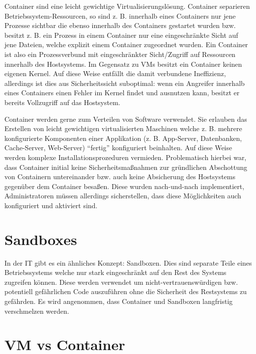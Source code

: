 Container sind eine leicht gewichtige Virtualisierungslösung. Container separieren Betriebssystem-Ressourcen, so sind z. B. innerhalb eines Containers nur jene Prozesse sichtbar die ebenso innerhalb des Containers gestartet wurden bzw. besitzt z. B. ein Prozess in einem Container nur eine eingeschränkte Sicht auf jene Dateien, welche explizit einem Container zugeordnet wurden. Ein Container ist also ein Prozessverbund mit eingeschränkter Sicht/Zugriff auf Ressourcen innerhalb des Hostsystems. Im Gegensatz zu VMs besitzt ein Container keinen eigenen Kernel. Auf diese Weise entfällt die damit verbundene Ineffizienz, allerdings ist dies aus Sicherheitssicht suboptimal: wenn ein Angreifer innerhalb eines Containers einen Fehler im Kernel findet und ausnutzen kann, besitzt er bereits Vollzugriff auf das Hostsystem.

Container werden gerne zum Verteilen von Software verwendet. Sie erlauben das Erstellen von leicht gewichtigen virtualisierten Maschinen welche z. B. mehrere konfigurierte Komponenten einer Applikation (z. B. App-Server, Datenbanken, Cache-Server, Web-Server) ``fertig'' konfiguriert beinhalten. Auf diese Weise werden komplexe Installationsprozeduren vermieden. Problematisch hierbei war, dass Container initial keine Sicherheitsmaßnahmen zur gründlichen Abschottung von Containern untereinander bzw. auch keine Absicherung des Hostsystems gegenüber dem Container besaßen. Diese wurden nach-und-nach implementiert, Administratoren müssen allerdings sicherstellen, dass diese Möglichkeiten auch konfiguriert und aktiviert sind.

\section{Sandboxes}

In der IT gibt es ein ähnliches Konzept: Sandboxen. Dies sind separate Teile eines Betriebssystems welche nur stark eingeschränkt auf den Rest des Systems zugreifen können. Diese werden verwendet um nicht-vertrauenswürdigen bzw. potentiell gefährlichen Code auszuführen ohne die Sicherheit des Restsystems zu gefährden. Es wird angenommen, dass Container und Sandboxen langfristig verschmelzen werden.

\section{VM vs Container}

